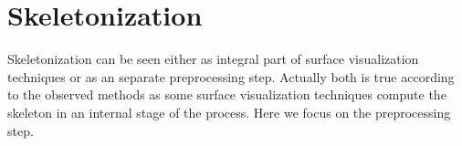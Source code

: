 \section{Skeletonization}

Skeletonization can be seen either as integral part of surface visualization techniques or as an separate preprocessing step. Actually both is true according to the observed methods as some surface visualization techniques compute the skeleton in an internal stage of the process. Here we focus on the preprocessing step.